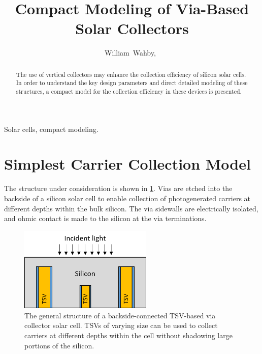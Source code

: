 \documentclass[journal,twoside]{IEEEtran}
\begin{document}

\title{Compact Modeling of Via-Based Solar Collectors}
\author{William~Wahby,~}


\maketitle



\begin{abstract}
The use of vertical collectors may enhance the collection efficiency of silicon solar cells.
In order to understand the key design parameters and direct detailed modeling of these structures,
a compact model for the collection efficiency in these devices is presented.
\end{abstract}

\begin{IEEEkeywords}
Solar cells, compact modeling.
\end{IEEEkeywords}

\section{Simplest Carrier Collection Model}
The structure under consideration is shown in \cref{f-via-collector-structure}. Vias are etched into the backside
of a silicon solar cell to enable collection of photogenerated carriers at different depths within the bulk silicon.
The via sidewalls are electrically isolated, and ohmic contact is made to the silicon at the via terminations.

\begin{figure}[tb]
	\centering
	\includegraphics[width=2.5in]{figures/structure_general.png}
	\caption{	The general structure of a backside-connected TSV-based via collector solar cell.
				TSVs of varying size can be used to collect carriers at different depths within the cell without
			shadowing large portions of the silicon.}
	\label{f-via-collector-structure}
\end{figure}
\end{document}
